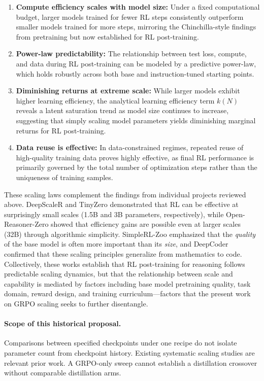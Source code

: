\begin{enumerate}
    \item \textbf{Compute efficiency scales with model size:} Under a fixed computational budget, larger models trained for fewer RL steps consistently outperform smaller models trained for more steps, mirroring the Chinchilla-style findings from pretraining but now established for RL post-training.
    \item \textbf{Power-law predictability:} The relationship between test loss, compute, and data during RL post-training can be modeled by a predictive power-law, which holds robustly across both base and instruction-tuned starting points.
    \item \textbf{Diminishing returns at extreme scale:} While larger models exhibit higher learning efficiency, the analytical learning efficiency term $k(N)$ reveals a latent saturation trend as model size continues to increase, suggesting that simply scaling model parameters yields diminishing marginal returns for RL post-training.
    \item \textbf{Data reuse is effective:} In data-constrained regimes, repeated reuse of high-quality training data proves highly effective, as final RL performance is primarily governed by the total number of optimization steps rather than the uniqueness of training samples.
\end{enumerate}

These scaling laws complement the findings from individual projects reviewed above. DeepScaleR and TinyZero demonstrated that RL can be effective at surprisingly small scales (1.5B and 3B parameters, respectively), while Open-Reasoner-Zero showed that efficiency gains are possible even at larger scales (32B) through algorithmic simplicity. SimpleRL-Zoo emphasized that the \emph{quality} of the base model is often more important than its \emph{size}, and DeepCoder confirmed that these scaling principles generalize from mathematics to code. Collectively, these works establish that RL post-training for reasoning follows predictable scaling dynamics, but that the relationship between scale and capability is mediated by factors including base model pretraining quality, task domain, reward design, and training curriculum---factors that the present work on GRPO scaling seeks to further disentangle.

\paragraph{Scope of this historical proposal.} Comparisons between specified checkpoints under one recipe do not isolate parameter count from checkpoint history. Existing systematic scaling studies are relevant prior work. A GRPO-only sweep cannot establish a distillation crossover without comparable distillation arms.
